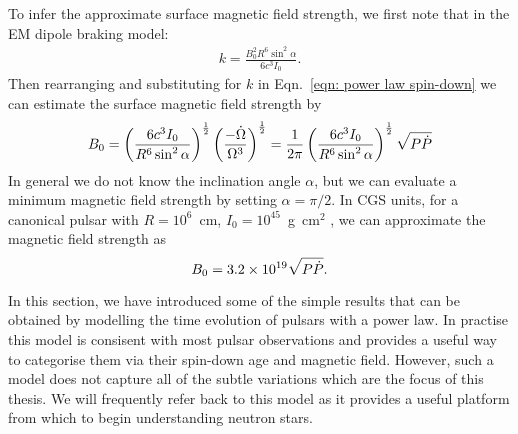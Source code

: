 To infer the approximate surface magnetic field strength, we first note that
in the EM dipole braking model:
\begin{align}
k = \frac{B_0^{2} R^{6} \sin^{2}\alpha}{6c^{3}I_0}.
\end{align}
Then rearranging and substituting for $k$ in Eqn.~\eqref{eqn: power law
spin-down} we can estimate the surface magnetic field strength by
\begin{equation}
    B_{0} = \left(\frac{6 c^{3} I_{0}}{R^{6} \sin^{2}\alpha}\right)^{\frac{1}{2}} 
            \left(\frac{-\dot{\Omega}}{\Omega^{3}}\right)^{\frac{1}{2}}
          = \frac{1}{2\pi}\left(\frac{6 c^{3} I_{0}}{R^{6} \sin^{2}\alpha}\right)^{\frac{1}{2}}
           \sqrt{P \dot{P}}
\label{eqn: surface magnetic field}
\end{equation}
In general we do not know the inclination angle $\alpha$, but we can evaluate a 
minimum magnetic field strength by setting $\alpha=\pi/2$. In CGS units, for a
canonical pulsar with $R=10^{6}$~cm, $I_{0}=10^{45}$~g~cm$^{2}$ \citep{Lyne2012book}, we can approximate
the magnetic field strength as
\begin{equation}
    B_{0} = 3.2 \times 10^{19} \sqrt{P \dot{P}}.
\label{eqn: surface magnetic field canonical}
\end{equation}

In this section, we have introduced some of the simple results that can be
obtained by modelling the time evolution of pulsars with a power law. In
practise this model is consisent with most pulsar observations and provides a
useful way to categorise them via their spin-down age and magnetic field.
However, such a model does not capture all of the subtle variations which are
the focus of this thesis.  We will frequently refer back to this model as it
provides a useful platform from which to begin understanding neutron stars.

